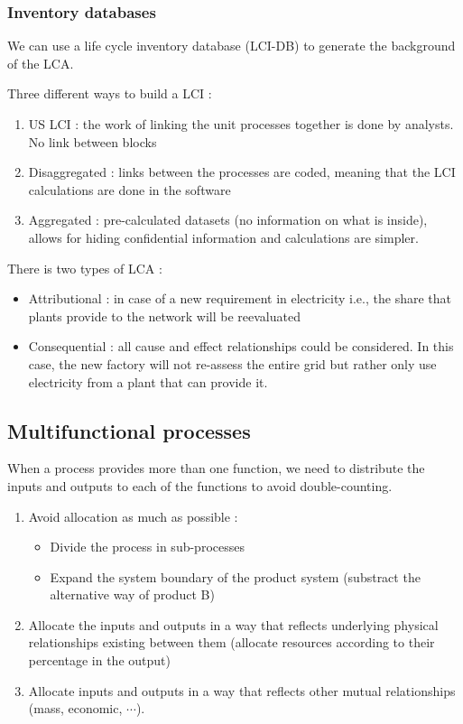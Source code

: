 \documentclass[../main.tex]{subfiles}
\begin{document}
\subsubsection{Inventory databases}
We can use a life cycle inventory database (LCI-DB) to generate the background of the LCA. 

Three different ways to build a LCI : \begin{enumerate}
    \item US LCI : the work of linking the unit processes together is done by analysts. No link between blocks
    \item Disaggregated : links between the processes are coded, meaning that the LCI calculations are done in the software
    \item Aggregated : pre-calculated datasets (no information on what is inside), allows for hiding confidential information and calculations are simpler.
\end{enumerate}

There is two types of LCA : \begin{itemize}
    \item Attributional : in case of a new requirement in electricity i.e., the share that plants provide to the network will be reevaluated
    \item Consequential : all cause and effect relationships could be considered. In this case, the new factory will not re-assess the entire grid but rather only use electricity from a plant that can provide it.
\end{itemize}

\subsection{Multifunctional processes}
When a process provides more than one function, we need to distribute the inputs and outputs to each of the functions to avoid double-counting.\\
\begin{enumerate}
    \item Avoid allocation as much as possible : 
    \begin{itemize}
        \item Divide the process in sub-processes
        \item Expand the system boundary of the product system (substract the alternative way of product B)
    \end{itemize}
    \item Allocate the inputs and outputs in a way that reflects underlying physical relationships existing between them (allocate resources according to their percentage in the output)
    \item Allocate inputs and outputs in a way that reflects other mutual relationships (mass, economic, $\cdots$).
\end{enumerate}
\end{document}

